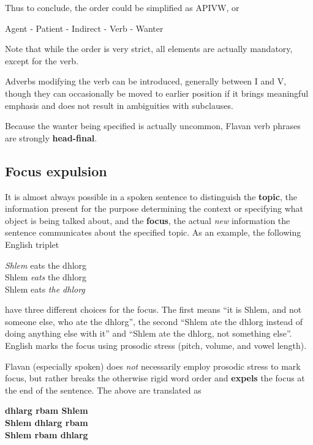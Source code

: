 \documentclass[10pt,oneside]{memoir}
\begin{document}
\begin{multicols}{2}
Thus to conclude, the order could be simplified as APIVW, or

\begin{center}
	Agent - Patient - Indirect - Verb - Wanter
\end{center}

Note that while the order is very strict, all elements are actually mandatory, except for the verb.

Adverbs modifying the verb can be introduced, generally between I and V, though they can occasionally be moved to earlier position if it brings meaningful emphasis and does not result in ambiguities with subclauses.

Because the wanter being specified is actually uncommon, Flavan verb phrases are strongly \textbf{head-final}.

\subsection{Focus expulsion}\label{focus}

It is almost always possible in a spoken sentence to distinguish the \textbf{topic}, the information present for the purpose determining the context or specifying what object is being talked about, and the \textbf{focus}, the actual \emph{new} information the sentence communicates about the specified topic. As an example, the following English triplet

\begin{center}
    \emph{Shlem} eats the dhlorg\\
    Shlem \emph{eats} the dhlorg\\
    Shlem eats \emph{the dhlorg}
\end{center}

have three different choices for the focus. The first means ``it is Shlem, and not someone else, who ate the dhlorg'', the second ``Shlem ate the dhlorg instead of doing anything else with it'' and ``Shlem ate the dhlorg, not something else''. English marks the focus using prosodic stress (pitch, volume, and vowel length).

Flavan (especially spoken) does \emph{not} necessarily employ prosodic stress to mark focus, but rather breaks the otherwise rigid word order and \textbf{expels} the focus at the end of the sentence. The above are translated as

\begin{center}
    \textbf{dhlarg rbam Shlem}\\
    \textbf{Shlem dhlarg rbam}\\
    \textbf{Shlem rbam dhlarg}
\end{center}


\end{multicols}
\end{document}

